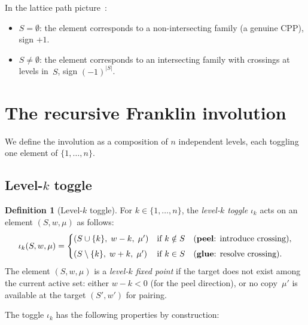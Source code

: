 \documentclass[11pt]{article}
\theoremstyle{plain}
\theoremstyle{definition}
\newtheorem{definition}[theorem]{Definition}
\begin{document}
In the lattice path picture~\cite{Q_NILP}:
\begin{itemize}
  \item $S = \emptyset$: the element corresponds to a
    non-intersecting family (a genuine CPP), sign $+1$.
  \item $S \neq \emptyset$: the element corresponds to an
    intersecting family with crossings at levels in~$S$,
    sign $(-1)^{|S|}$.
\end{itemize}


\section{The recursive Franklin involution}
\label{sec:recursive}

We define the involution as a composition of $n$ independent
levels, each toggling one element of $\{1, \ldots, n\}$.


\subsection{Level-$k$ toggle}

\begin{definition}[Level-$k$ toggle]
\label{def:toggle}
For $k \in \{1, \ldots, n\}$, the \emph{level-$k$ toggle}
$\iota_k$ acts on an element $(S, w, \mu)$ as follows:
\begin{equation}\label{eq:toggle}
  \iota_k(S, w, \mu) =
  \begin{cases}
    (S \cup \{k\},\; w - k,\; \mu')
      & \text{if } k \notin S
      \quad\text{(\textbf{peel}: introduce crossing)}, \\[4pt]
    (S \setminus \{k\},\; w + k,\; \mu')
      & \text{if } k \in S
      \quad\text{(\textbf{glue}: resolve crossing)}.
  \end{cases}
\end{equation}
The element $(S, w, \mu)$ is a \emph{level-$k$ fixed point}
if the target does not exist among the current active set:
either $w - k < 0$ (for the peel direction), or no copy~$\mu'$
is available at the target $(S', w')$ for pairing.
\end{definition}

The toggle $\iota_k$ has the following properties by
construction:
\end{document}
